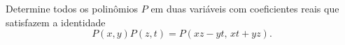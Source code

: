 Determine todos os polinômios \(P\) em duas variáveis com coeficientes reais que satisfazem a identidade
\[
P(x,y)P(z,t) = P(xz - yt,\, xt + yz).
\]
